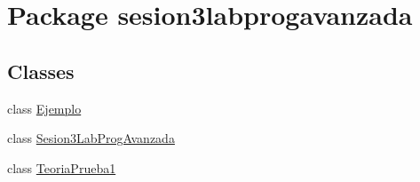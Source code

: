 \hypertarget{namespacesesion3labprogavanzada}{}\section{Package sesion3labprogavanzada}
\label{namespacesesion3labprogavanzada}
\subsection*{Classes}
\begin{DoxyCompactItemize}
\item 
class \mbox{\hyperlink{classsesion3labprogavanzada_1_1_ejemplo}{Ejemplo}}
\item 
class \mbox{\hyperlink{classsesion3labprogavanzada_1_1_sesion3_lab_prog_avanzada}{Sesion3\+Lab\+Prog\+Avanzada}}
\item 
class \mbox{\hyperlink{classsesion3labprogavanzada_1_1_teoria_prueba1}{Teoria\+Prueba1}}
\end{DoxyCompactItemize}
